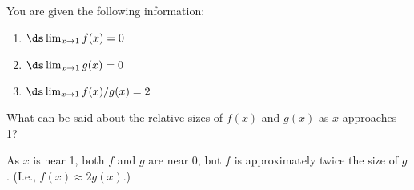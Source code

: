 {You are given the following information: 
	\begin{enumerate}
	\item		$\ds \lim_{x\to 1} f(x) = 0$
	\item		$\ds \lim_{x\to 1} g(x) = 0$
	\item		$\ds \lim_{x\to 1} f(x)/g(x) = 2$
	\end{enumerate}
What can be said about the relative sizes of $f(x)$ and $g(x)$ as $x$ approaches 1?	
}
{As $x$ is near 1, both $f$ and $g$ are near 0, but $f$ is approximately twice the size of $g$. (I.e., $f(x) \approx 2g(x)$.)
}
